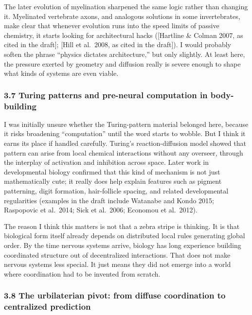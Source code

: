 The later evolution of myelination sharpened the same logic rather than changing it. Myelinated vertebrate axons, and analogous solutions in some invertebrates, make clear that whenever evolution runs into the speed limits of passive chemistry, it starts looking for architectural hacks ({[}Hartline \& Colman 2007, as cited in the draft{]}; {[}Hill et al.~2008, as cited in the draft{]}). I would probably soften the phrase ``physics dictates architecture,'' but only slightly. At least here, the pressure exerted by geometry and diffusion really is severe enough to shape what kinds of systems are even viable.

\subsubsection{3.7 Turing patterns and pre-neural computation in body-building}\label{03_it_started-turing-patterns-and-pre-neural-computation-in-body-building}

I was initially unsure whether the Turing-pattern material belonged here, because it risks broadening ``computation'' until the word starts to wobble. But I think it earns its place if handled carefully. Turing's reaction-diffusion model showed that pattern can arise from local chemical interactions without any overseer, through the interplay of activation and inhibition across space. Later work in developmental biology confirmed that this kind of mechanism is not just mathematically cute; it really does help explain features such as pigment patterning, digit formation, hair-follicle spacing, and related developmental regularities (examples in the draft include Watanabe and Kondo 2015; Raspopovic et al.~2014; Sick et al.~2006; Economou et al.~2012).

The reason I think this matters is not that a zebra stripe is thinking. It is that biological form itself already depends on distributed local rules generating global order. By the time nervous systems arrive, biology has long experience building coordinated structure out of decentralized interactions. That does not make nervous systems less special. It just means they did not emerge into a world where coordination had to be invented from scratch.

\subsubsection{3.8 The urbilaterian pivot: from diffuse coordination to centralized prediction}\label{03_it_started-the-urbilaterian-pivot-from-diffuse-coordination-to-centralized-prediction}


